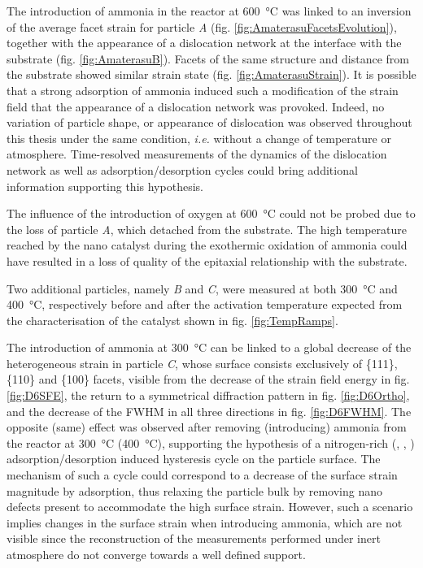 The introduction of ammonia in the reactor at \qty{600}{\degreeCelsius} was linked to an inversion of the average facet strain for particle \textit{A} (fig. \ref{fig:AmaterasuFacetsEvolution}), together with the appearance of a dislocation network at the interface with the substrate (fig. \ref{fig:AmaterasuB}).
Facets of the same structure and distance from the substrate showed similar strain state (fig. \ref{fig:AmaterasuStrain}).
It is possible that a strong adsorption of ammonia induced such a modification of the strain field that the appearance of a dislocation network was provoked.
Indeed, no variation of particle shape, or appearance of dislocation was observed throughout this thesis under the same condition, \textit{i.e.} without a change of temperature or atmosphere.
Time-resolved measurements of the dynamics of the dislocation network as well as adsorption/desorption cycles could bring additional information supporting this hypothesis.

The influence of the introduction of oxygen at \qty{600}{\degreeCelsius} could not be probed due to the loss of particle \textit{A}, which detached from the substrate.
The high temperature reached by the nano catalyst during the exothermic oxidation of ammonia \parencite{Hatscher2008} could have resulted in a loss of quality of the epitaxial relationship with the substrate.

Two additional particles, namely \textit{B} and \textit{C}, were measured at both \qty{300}{\degreeCelsius} and \qty{400}{\degreeCelsius}, respectively before and after the activation temperature expected from the characterisation of the catalyst shown in fig. \ref{fig:TempRamps}.

The introduction of ammonia at \qty{300}{\degreeCelsius} can be linked to a global decrease of the heterogeneous strain in particle \textit{C}, whose surface consists exclusively of \{111\}, \{110\} and \{100\} facets, visible from the decrease of the strain field energy in fig. \ref{fig:D6SFE}, the return to a symmetrical diffraction pattern in fig. \ref{fig:D6Ortho}, and the decrease of the FWHM in all three directions in fig. \ref{fig:D6FWHM}.
The opposite (same) effect was observed after removing (introducing) ammonia from the reactor at \qty{300}{\degreeCelsius} (\qty{400}{\degreeCelsius}), supporting the hypothesis of a nitrogen-rich (, , ) adsorption/desorption induced hysteresis cycle on the particle surface.
The mechanism of such a cycle could correspond to a decrease of the surface strain magnitude by adsorption, thus relaxing the particle bulk by removing nano defects present to accommodate the high surface strain.
However, such a scenario implies changes in the surface strain when introducing ammonia, which are not visible since the reconstruction of the measurements performed under inert atmosphere do not converge towards a well defined support.

